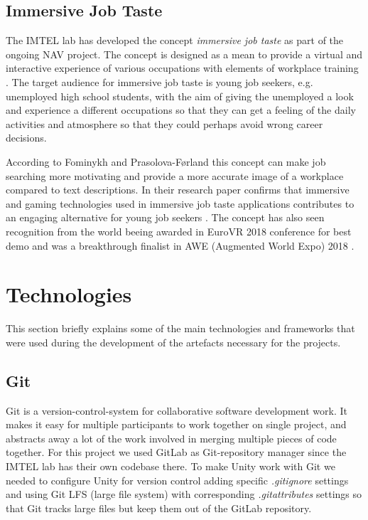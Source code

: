 \subsection{Immersive Job Taste}
The IMTEL lab has developed the concept \textit{immersive job taste} as part of the ongoing NAV  project. The concept is designed as a mean to provide a virtual and interactive experience of various occupations with elements of workplace training \cite{fominykh2019immersive}. The target audience for immersive job taste is  young job seekers, e.g. unemployed high school students, with the aim of giving the unemployed a look and experience a different occupations so that they can get a feeling of the daily activities and atmosphere so that they could perhaps avoid wrong career decisions. 

According to Fominykh and Prasolova-Førland \cite{fominykh2019immersive} this concept can make job searching more motivating and provide a more accurate image of a workplace compared to text descriptions. In their research paper confirms that immersive and gaming technologies used in immersive job taste applications contributes to an engaging alternative for young job seekers \cite{fominykh2019immersive}. The concept has also seen recognition from the world beeing awarded in EuroVR 2018 conference for best demo \cite{euroVR} and was a breakthrough finalist in AWE (Augmented World Expo) 2018 \cite{aweAwards}.



\section{Technologies}
\label{sec:technologies}
This section briefly explains some of the main technologies and frameworks that were used during the development of the artefacts necessary for the projects. 

\subsection{Git}
Git is a version-control-system for collaborative software development work. It makes it easy for multiple participants to work together on single project, and abstracts away a lot of the work involved in merging multiple pieces of code together. For this project we used GitLab \cite{GitLab} as Git-repository manager since the IMTEL lab has their own codebase there. To make Unity work with Git we needed to configure Unity for version control adding specific \textit{.gitignore} settings and using Git LFS (large file system) with corresponding \textit{.gitattributes} settings so that Git tracks large files but keep them out of the GitLab repository. 

